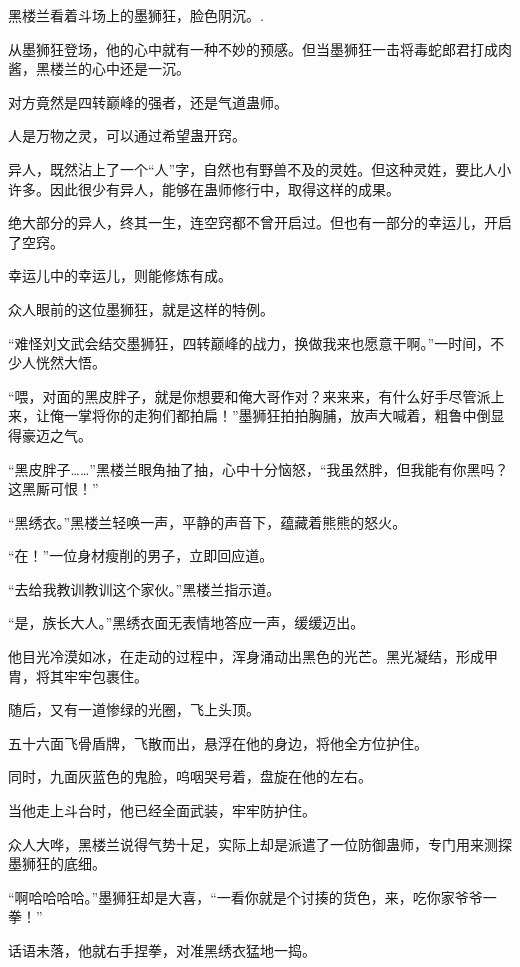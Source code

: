 
\begin{this_body}

黑楼兰看着斗场上的墨狮狂，脸色阴沉。.

从墨狮狂登场，他的心中就有一种不妙的预感。但当墨狮狂一击将毒蛇郎君打成肉酱，黑楼兰的心中还是一沉。

对方竟然是四转巅峰的强者，还是气道蛊师。

人是万物之灵，可以通过希望蛊开窍。

异人，既然沾上了一个“人”字，自然也有野兽不及的灵姓。但这种灵姓，要比人小许多。因此很少有异人，能够在蛊师修行中，取得这样的成果。

绝大部分的异人，终其一生，连空窍都不曾开启过。但也有一部分的幸运儿，开启了空窍。

幸运儿中的幸运儿，则能修炼有成。

众人眼前的这位墨狮狂，就是这样的特例。

“难怪刘文武会结交墨狮狂，四转巅峰的战力，换做我来也愿意干啊。”一时间，不少人恍然大悟。

“喂，对面的黑皮胖子，就是你想要和俺大哥作对？来来来，有什么好手尽管派上来，让俺一掌将你的走狗们都拍扁！”墨狮狂拍拍胸脯，放声大喊着，粗鲁中倒显得豪迈之气。

“黑皮胖子……”黑楼兰眼角抽了抽，心中十分恼怒，“我虽然胖，但我能有你黑吗？这黑厮可恨！”

“黑绣衣。”黑楼兰轻唤一声，平静的声音下，蕴藏着熊熊的怒火。

“在！”一位身材瘦削的男子，立即回应道。

“去给我教训教训这个家伙。”黑楼兰指示道。

“是，族长大人。”黑绣衣面无表情地答应一声，缓缓迈出。

他目光冷漠如冰，在走动的过程中，浑身涌动出黑色的光芒。黑光凝结，形成甲胄，将其牢牢包裹住。

随后，又有一道惨绿的光圈，飞上头顶。

五十六面飞骨盾牌，飞散而出，悬浮在他的身边，将他全方位护住。

同时，九面灰蓝色的鬼脸，呜咽哭号着，盘旋在他的左右。

当他走上斗台时，他已经全面武装，牢牢防护住。

众人大哗，黑楼兰说得气势十足，实际上却是派遣了一位防御蛊师，专门用来测探墨狮狂的底细。

“啊哈哈哈哈。”墨狮狂却是大喜，“一看你就是个讨揍的货色，来，吃你家爷爷一拳！”

话语未落，他就右手捏拳，对准黑绣衣猛地一捣。


\end{this_body}
